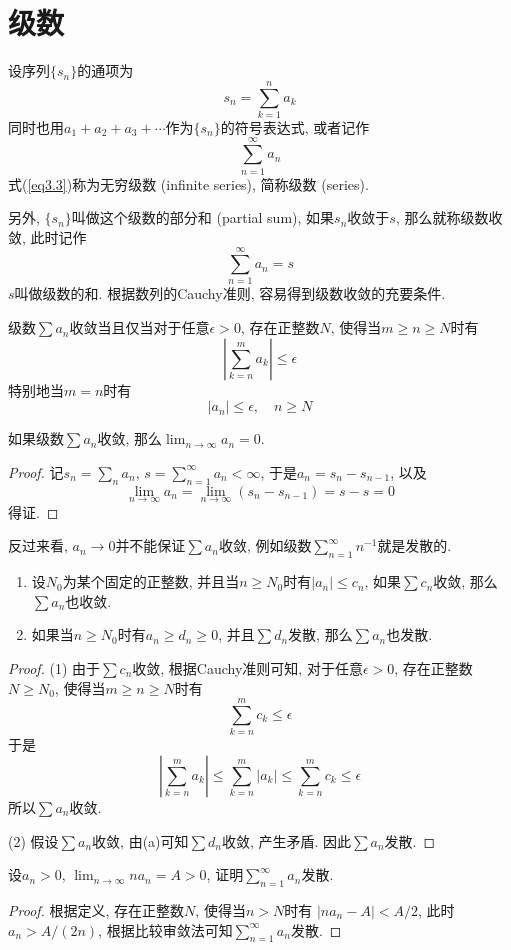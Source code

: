 \documentclass[cn,12pt,math=mtpro2,citestyle=gb7714-2015,bibstyle=gb7714-2015,twocol]{elegantbook}
\newcommand{\limn }{\lim_{n\to\infty}}
\begin{document}
\section{级数}
\begin{definition}
设序列$\{s_n\}$的通项为
$$s_n=\sum_{k=1}^{n}a_k$$
同时也用$a_1+a_2+a_3+\cdots$作为$\{s_n\}$的符号表达式, 或者记作
\begin{equation}\label{eq3.3}
  \sum_{n=1}^{\infty}a_n
\end{equation}
式(\ref{eq3.3})称为无穷级数 (infinite series), 简称级数 (series).
\end{definition}
另外, $\{s_n\}$叫做这个级数的部分和 (partial sum), 如果$s_n$收敛于$s$, 那么就称级数收敛, 此时记作
$$\sum_{n=1}^{\infty}a_n=s$$
$s$叫做级数的和. 根据数列的Cauchy准则, 容易得到级数收敛的充要条件.
\begin{theorem}[Cauchy准则]
  级数$\sum a_n$收敛当且仅当对于任意$\epsilon>0$, 存在正整数$N$, 使得当$m\geq n\geq N$时有
  $$\left|\sum_{k=n}^{m}a_k\right|\leq\epsilon$$
  特别地当$m=n$时有
$$|a_n|\leq\epsilon, \quad n\geq N$$
\end{theorem}
\begin{corollary}
  如果级数$\sum a_n$收敛, 那么$\limn a_n=0$.
\end{corollary}
\begin{proof}
  记$s_n=\sum_na_n$, $s=\sum_{n=1}^{\infty} a_n<\infty$, 于是$a_n=s_{n}-s_{n-1}$, 以及
  $$\limn a_n=\limn (s_n-s_{n-1})=s-s=0$$
  得证.
\end{proof}
\begin{remark}
反过来看, $a_n\rightarrow0$并不能保证$\sum a_n$收敛, 例如级数$\sum_{n=1}^{\infty} n^{-1}$就是发散的.
\end{remark}
\begin{theorem}[比较审敛法]
\begin{enumerate}[label=(\arabic*)]
\item 设$N_0$为某个固定的正整数, 并且当$n\geq N_0$时有$|a_n|\leq c_n$, 如果$\sum c_n$收敛, 那么$\sum a_n$也收敛.

\item 如果当$n\geq N_0$时有$a_n\geq d_n\geq 0$, 并且$\sum d_n$发散, 那么$\sum a_n$也发散.
\end{enumerate}
\end{theorem}
\begin{proof}
  (1) 由于$\sum c_n$收敛, 根据Cauchy准则可知, 对于任意$\epsilon>0$, 存在正整数$N\geq N_0$, 使得当$m\geq n\geq N$时有
  $$\sum_{k=n}^{m}c_k\leq\epsilon$$
  于是
  $$\left|\sum_{k=n}^{m}a_k\right|\leq\sum_{k=n}^{m}|a_k|\leq\sum_{k=n}^{m}c_k\leq\epsilon$$
  所以$\sum a_n$收敛.

  (2) 假设$\sum a_n$收敛, 由(a)可知$\sum d_n$收敛, 产生矛盾. 因此$\sum a_n$发散.
\end{proof}
\begin{example}
设$a_n>0$, $\limn na_n=A>0$, 证明$\sum_{n=1}^{\infty}a_n$发散.
\end{example}
\begin{proof}
  根据定义, 存在正整数$N$, 使得当$n>N$时有
  $|na_n-A|<A/2$, 此时$a_n>A/(2n)$, 根据比较审敛法可知$\sum_{n=1}^{\infty}a_n$发散.
\end{proof}
\end{document}
